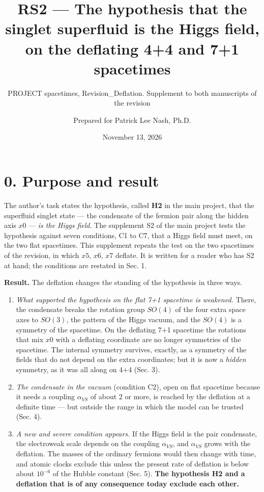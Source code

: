\documentclass[
  10pt,
]{article}
\title{RS2 --- The hypothesis that the singlet superfluid is the Higgs
field, on the deflating 4+4 and 7+1 spacetimes}
\subtitle{PROJECT spacetimes, Revision\_Deflation. Supplement to both
manuscripts of the revision}
\author{Prepared for Patrick Lee Nash, Ph.D.}
\date{November 13, 2026}
\providecommand{\tightlist}{%
  \setlength{\itemsep}{0pt}\setlength{\parskip}{0pt}}
\begin{document}
\maketitle

\hypertarget{purpose-and-result}{%
\section{0. Purpose and result}\label{purpose-and-result}}

The author's task states the hypothesis, called \textbf{H2} in the main
project, that the superfluid singlet state --- the condensate of the
fermion pair along the hidden axis \(x0\) --- \emph{is the Higgs field}.
The supplement S2 of the main project tests the hypothesis against seven
conditions, C1 to C7, that a Higgs field must meet, on the two flat
spacetimes. This supplement repeats the test on the two spacetimes of
the revision, in which \(x5\), \(x6\), \(x7\) deflate. It is written for
a reader who has S2 at hand; the conditions are restated in Sec. 1.

\textbf{Result.} The deflation changes the standing of the hypothesis in
three ways.

\begin{enumerate}
\def\labelenumi{\arabic{enumi}.}
\tightlist
\item
  \emph{What supported the hypothesis on the flat 7+1 spacetime is
  weakened.} There, the condensate breaks the rotation group \(SO(4)\)
  of the four extra space axes to \(SO(3)\), the pattern of the Higgs
  vacuum, and the \(SO(4)\) is a symmetry of the spacetime. On the
  deflating 7+1 spacetime the rotations that mix \(x0\) with a deflating
  coordinate are no longer symmetries of the spacetime. The internal
  symmetry survives, exactly, as a symmetry of the fields that do not
  depend on the extra coordinates; but it is now a \emph{hidden}
  symmetry, as it was all along on 4+4 (Sec. 3).
\item
  \emph{The condensate in the vacuum} (condition C2), open on flat
  spacetime because it needs a coupling \(\alpha_{VS}\) of about 2 or
  more, is reached by the deflation at a definite time --- but outside
  the range in which the model can be trusted (Sec. 4).
\item
  \emph{A new and severe condition appears.} If the Higgs field is the
  pair condensate, the electroweak scale depends on the coupling
  \(\alpha_{VS}\), and \(\alpha_{VS}\) grows with the deflation. The
  masses of the ordinary fermions would then change with time, and
  atomic clocks exclude this unless the present rate of deflation is
  below about \(10^{-6}\) of the Hubble constant (Sec. 5). \textbf{The
  hypothesis H2 and a deflation that is of any consequence today exclude
  each other.}
\end{enumerate}
\end{document}
